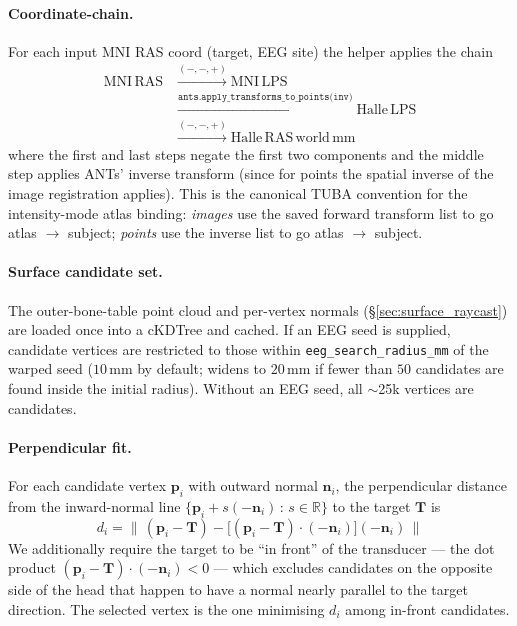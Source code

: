 \documentclass{compactarticle}
\begin{document}
\paragraph{Coordinate-chain.}
For each input MNI RAS coord (target, EEG site) the helper applies the
chain
\begin{align}
\mathrm{MNI\,RAS} &\xrightarrow{(-,-,+)} \mathrm{MNI\,LPS} \nonumber\\
&\xrightarrow{\texttt{ants.apply\_transforms\_to\_points(inv)}}
   \mathrm{Halle\,LPS} \nonumber\\
&\xrightarrow{(-,-,+)} \mathrm{Halle\,RAS\,world\,mm}\label{eq:coord_chain}
\end{align}
where the first and last steps negate the first two components and the
middle step applies ANTs' inverse transform (since for points the
spatial inverse of the image registration applies). This is the
canonical TUBA convention for the intensity-mode atlas binding:
{\em images} use the saved forward transform list to go atlas $\rightarrow$
subject; {\em points} use the inverse list to go atlas $\rightarrow$ subject.

\paragraph{Surface candidate set.}
The outer-bone-table point cloud and per-vertex normals
(\S\ref{sec:surface_raycast}) are loaded once into a cKDTree and cached.
If an EEG seed is supplied, candidate vertices are restricted to those
within \texttt{eeg\_search\_radius\_mm} of the warped seed
($10$\,mm by default; widens to $20$\,mm if fewer than $50$ candidates
are found inside the initial radius). Without an EEG seed, all $\sim$25k
vertices are candidates.

\paragraph{Perpendicular fit.}
For each candidate vertex $\mathbf{p}_i$ with outward normal $\mathbf{n}_i$,
the perpendicular distance from the inward-normal line
$\{\mathbf{p}_i + s(-\mathbf{n}_i)\,:\,s\in\mathbb{R}\}$ to the target
$\mathbf{T}$ is
\begin{equation}
d_i = \big\|\,(\mathbf{p}_i - \mathbf{T}) -
          \big[(\mathbf{p}_i - \mathbf{T}) \cdot (-\mathbf{n}_i)\big](-\mathbf{n}_i)\,\big\|
\end{equation}
We additionally require the target to be ``in front'' of the
transducer --- the dot product $(\mathbf{p}_i - \mathbf{T})\cdot(-\mathbf{n}_i)
< 0$ --- which excludes candidates on the opposite side of the head
that happen to have a normal nearly parallel to the target direction.
The selected vertex is the one minimising $d_i$ among in-front
candidates.
\end{document}
